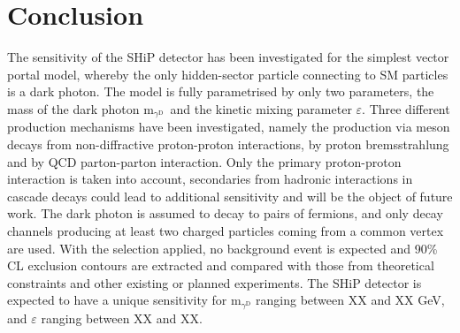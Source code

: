 \documentclass[12pt,a4paper,]{article}
\newcommand{\mathDP}{\gamma^{\mathrm{D}}\ }
\newcommand{\mDP}{m$_{\mathDP}$}
\begin{document}
\section{Conclusion}
\label{sec:concl}


The sensitivity of the SHiP detector has been investigated for the
simplest vector portal model, whereby the only hidden-sector particle
connecting to SM particles is a dark photon. The model is fully
parametrised by only two parameters, the mass of the dark photon \mDP
and the kinetic mixing parameter $\varepsilon$. Three different
production mechanisms have been investigated, namely the production
via meson decays from non-diffractive proton-proton interactions, by
proton bremsstrahlung and by QCD parton-parton interaction. Only the
primary proton-proton interaction is taken into account, secondaries
from hadronic interactions in cascade decays could lead to additional
sensitivity and will be the object of future work. The dark photon is
assumed to decay to pairs of fermions, and only decay channels
producing at least two charged particles coming from a common vertex
are used. With the selection applied, no background event is expected
and 90\% CL exclusion contours are extracted and compared with those
from theoretical constraints and other existing or planned
experiments. The SHiP detector is expected to have a unique
sensitivity for m$_{\gamma^{\mathrm{D}}}$ ranging between XX and XX
GeV, and $\varepsilon$ ranging between XX and XX.



\cleardoublepage


\end{document}
